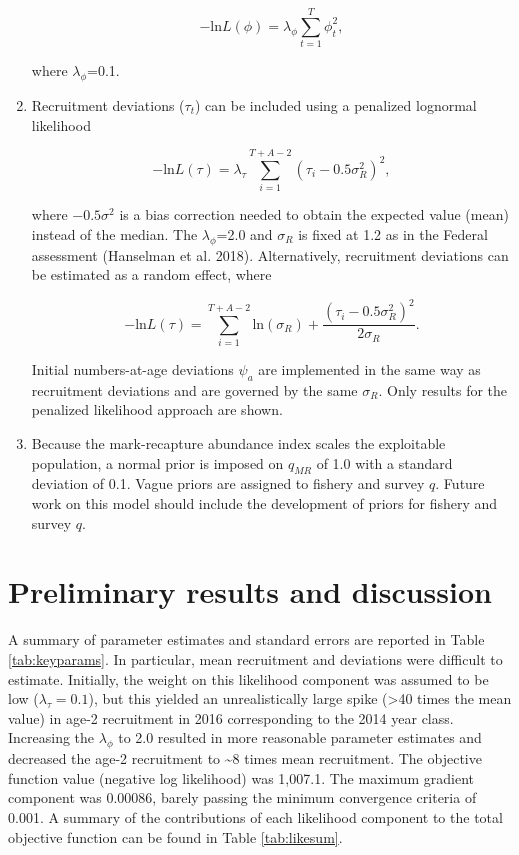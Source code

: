 \documentclass[]{article}
\begin{document}
\begin{enumerate}
  \begin{equation}
  -\mbox{ln}L(\phi)=\lambda_{\phi}\sum_{t=1}^{T}\phi_t^2,
  \label{eq:fmortlike}
  \end{equation}

  where \(\lambda_{\phi}\)=0.1.
\item
  Recruitment deviations (\(\tau_t\)) can be included using a penalized
  lognormal likelihood

  \begin{equation}
  -\mbox{ln}L(\tau)=\lambda_{\tau}\sum_{i=1}^{T+A-2}(\tau_i-0.5\sigma_R^2)^2,
  \label{eq:reclike}
  \end{equation}

  where \(-0.5\sigma^2\) is a bias correction needed to obtain the
  expected value (mean) instead of the median. The
  \(\lambda_{\phi}\)=2.0 and \(\sigma_R\) is fixed at 1.2 as in the
  Federal assessment (Hanselman et al. 2018). Alternatively, recruitment
  deviations can be estimated as a random effect, where

  \begin{equation}
  -\mbox{ln}L(\tau)=\sum_{i=1}^{T+A-2}\mbox{ln}(\sigma_R)+\frac{(\tau_i-0.5\sigma_R^2)^2}{2\sigma_R}.
  \label{eq:randomrec}
  \end{equation}

  Initial numbers-at-age deviations \(\psi_a\) are implemented in the
  same way as recruitment deviations and are governed by the same
  \(\sigma_R\). Only results for the penalized likelihood approach are
  shown.
\item
  Because the mark-recapture abundance index scales the exploitable
  population, a normal prior is imposed on \(q_{MR}\) of 1.0 with a
  standard deviation of 0.1. Vague priors are assigned to fishery and
  survey \(q\). Future work on this model should include the development
  of priors for fishery and survey \(q\).
\end{enumerate}

\section{Preliminary results and
discussion}\label{preliminary-results-and-discussion}

A summary of parameter estimates and standard errors are reported in
Table \ref{tab:keyparams}. In particular, mean recruitment and
deviations were difficult to estimate. Initially, the weight on this
likelihood component was assumed to be low (\(\lambda_{\tau}=0.1\)), but
this yielded an unrealistically large spike (\textgreater{}40 times the
mean value) in age-2 recruitment in 2016 corresponding to the 2014 year
class. Increasing the \(\lambda_{\phi}\) to 2.0 resulted in more
reasonable parameter estimates and decreased the age-2 recruitment to
\textasciitilde{}8 times mean recruitment. The objective function value
(negative log likelihood) was 1,007.1. The maximum gradient component
was 0.00086, barely passing the minimum convergence criteria of 0.001. A
summary of the contributions of each likelihood component to the total
objective function can be found in Table \ref{tab:likesum}.
\end{document}
